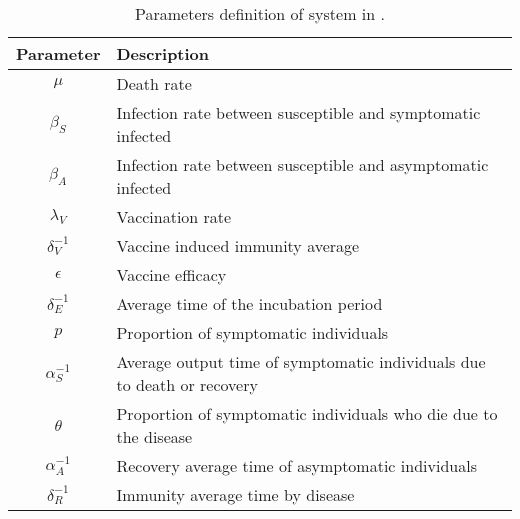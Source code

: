 \begin{table}[h!]
    \centering
    \begin{tabular}{cl}
        \toprule
        Parameter & Description
        \\
        \midrule
        $\mu$ &  Death rate
        \\
        $\beta_S$ & Infection rate between
        susceptible and symptomatic infected
        \\
        $\beta_A$ & Infection rate between
        susceptible and asymptomatic infected
        \\
        $\lambda_V$ & Vaccination rate
        \\
        $\delta_{V}^{-1}$ & Vaccine induced immunity average
        \\
        $\epsilon$ &  Vaccine efficacy
        \\
        $\delta_{E}^{-1}$
            & Average time of the incubation period
        \\
        $p$ & Proportion of symptomatic individuals
        \\
        $\alpha_{S}^{-1}$ &  Average output
        time of symptomatic individuals due
        to death or recovery  \\
        $\theta$ & Proportion of symptomatic
        individuals who die due to the
        disease \\
        $\alpha_{A}^{-1}$ & Recovery average
        time of asymptomatic individuals
        \\
        $\delta_{R}^{-1}$ &  Immunity average
        time by disease \\
        \bottomrule
    \end{tabular}
    \caption{
        Parameters definition of system in
        .
    }\label{table:parametermodel}
\end{table}
%
